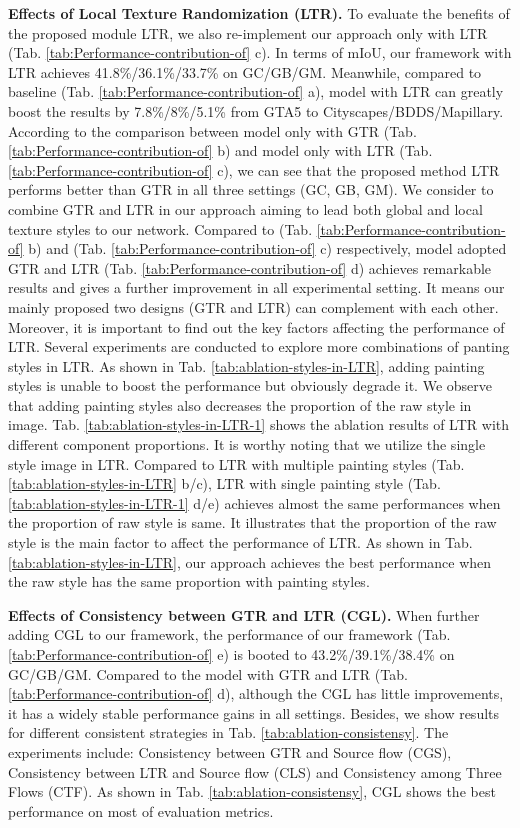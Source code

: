 \documentclass[twocolumn,journal,vlined,ruled,linesnumbered]{IEEEtran}
\begin{document}
\textbf{Effects of Local Texture Randomization (LTR).} To evaluate the benefits of the proposed module LTR, we also re-implement our approach only with LTR (Tab. \ref{tab:Performance-contribution-of} c). In terms of mIoU, our framework with LTR achieves 41.8\%/36.1\%/33.7\% on GC/GB/GM. Meanwhile,
compared to baseline (Tab. \ref{tab:Performance-contribution-of} a), model with LTR can greatly boost the results by 7.8\%/8\%/5.1\% from GTA5 to Cityscapes/BDDS/Mapillary. According to the comparison between model only with GTR (Tab. \ref{tab:Performance-contribution-of} b) and model only with LTR (Tab. \ref{tab:Performance-contribution-of} c), we can see that the proposed method LTR performs better than GTR in all three settings (GC, GB, GM). We consider to combine GTR and LTR in our approach aiming to lead both global and local texture styles to our network. Compared to (Tab. \ref{tab:Performance-contribution-of} b) and (Tab. \ref{tab:Performance-contribution-of} c) respectively, model adopted GTR and LTR (Tab. \ref{tab:Performance-contribution-of} d) achieves remarkable results and gives a further improvement in all experimental setting. It means our mainly proposed two designs (GTR and LTR) can complement with each other. Moreover, it is important to find out the key factors affecting the performance of LTR. Several experiments are conducted to explore more combinations of panting styles in LTR. As shown in Tab. \ref{tab:ablation-styles-in-LTR}, adding painting styles is unable to boost the performance but obviously degrade it. We observe that adding painting styles also decreases the proportion of the raw style in image. Tab. \ref{tab:ablation-styles-in-LTR-1} shows the ablation results of LTR with different component proportions. It is worthy noting that we utilize the single style image in LTR. Compared to LTR with multiple painting styles (Tab. \ref{tab:ablation-styles-in-LTR} b/c), LTR with single painting style (Tab. \ref{tab:ablation-styles-in-LTR-1} d/e) achieves almost the same performances when the proportion of raw style is same. It illustrates that the proportion of the raw style is the main factor to affect the performance of LTR. As shown in Tab. \ref{tab:ablation-styles-in-LTR}, our approach achieves the best performance when the raw style has the same proportion with painting styles.

\textbf{Effects of Consistency between GTR and LTR (CGL).} When further adding CGL to our framework, the performance of our framework (Tab. \ref{tab:Performance-contribution-of} e) is booted to 43.2\%/39.1\%/38.4\% on GC/GB/GM. Compared to the model with GTR and LTR (Tab. \ref{tab:Performance-contribution-of} d), although the CGL has little improvements, it has a widely stable performance gains in all settings. Besides, we show results for different consistent strategies in Tab. \ref{tab:ablation-consistensy}. The experiments include: Consistency between GTR and Source flow (CGS), Consistency between LTR and Source flow (CLS) and Consistency among Three Flows (CTF). As shown in Tab. \ref{tab:ablation-consistensy}, CGL shows the best performance on most of evaluation metrics.
\end{document}

